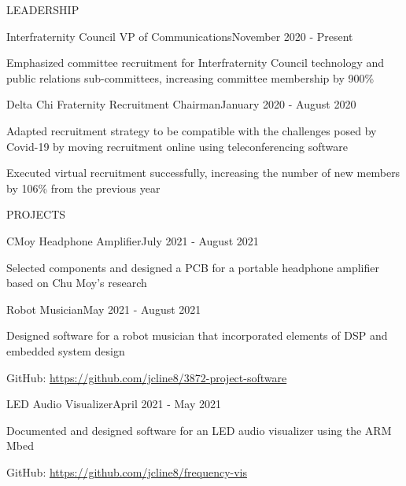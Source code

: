 \documentclass{resume}
\begin{document}
\begin{rSection}{LEADERSHIP}
	\begin{rSubsection}{Interfraternity Council VP of Communications}{November 2020 - Present}{}{}{}
		\item Emphasized committee recruitment for Interfraternity Council technology and public relations sub-committees, increasing committee membership by 900\%
	\end{rSubsection}
	\begin{rSubsection}{Delta Chi Fraternity Recruitment Chairman}{January 2020 - August 2020}{}{}{}
		\item Adapted recruitment strategy to be compatible with the challenges posed by Covid-19 by moving recruitment online using teleconferencing software
		\item Executed virtual recruitment successfully, increasing the number of new members by 106\% from the previous year
	\end{rSubsection}
\end{rSection}
\begin{rSection}{PROJECTS}
	\begin{rSubsection}{CMoy Headphone Amplifier}{July 2021 - August 2021}{}{}{}
		\item Selected components and designed a PCB for a portable headphone amplifier based on Chu Moy's research
	\end{rSubsection}
	\begin{rSubsection}{Robot Musician}{May 2021 - August 2021}{}{}{}
		\item Designed software for a robot musician that incorporated elements of DSP and embedded system design
		\item GitHub: \url{https://github.com/jcline8/3872-project-software}
	\end{rSubsection}
	\begin{rSubsection}{LED Audio Visualizer}{April 2021 - May 2021}{}{}{}
		\item Documented and designed software for an LED audio visualizer using the ARM Mbed
		\item GitHub: \url{https://github.com/jcline8/frequency-vis}
	\end{rSubsection}
\end{rSection}
\end{document}
